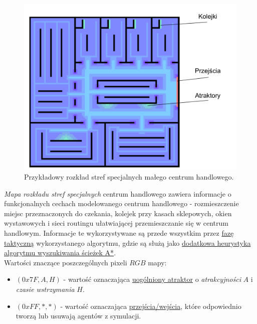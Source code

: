 \documentclass[a4paper, 12pt]{article}
\begin{document}
        \begin{figure}[H]
            \centering
            \includegraphics[scale=0.3]{./img/MallFeatures.pdf}
            \caption{Przykładowy rozkład stref specjalnych małego centrum handlowego.}
            \label{fig:mall-features}
        \end{figure}

        \emph{Mapa rozkładu stref specjalnych} centrum handlowego zawiera informacje o funkcjonalnych cechach modelowanego centrum handlowego - rozmieszczenie miejsc przeznaczonych do czekania, kolejek przy kasach sklepowych, okien wystawowych i sieci routingu ułatwiającej przemieszczanie się w centrum handlowym. Informacje te wykorzystywane są przede wszystkim przez \hyperref[sec:tactical]{fazę taktyczną} wykorzystanego algorytmu, gdzie są służą jako \hyperref[sec:path-deviation]{dodatkowa heurystyka} \hyperref[sec:path-finding]{algorytmu wyszukiwania ścieżek A*}. \\

\noindent
Wartości znaczące poszczególnych pixeli $RGB$ mapy:

        \begin{itemize}
            \item $(0x7F, A, H)$ - wartość oznaczająca \hyperref[sec:path-deviation]{uogólniony atraktor} o \emph{atrakcyjności} $A$ i \emph{czasie wstrzymania} $H$.
            \item $(0xFF, *, *)$ - wartość oznaczająca \hyperref[sec:entrance-exits]{przejścia/wejścia}, które odpowiednio tworzą lub usuwają agentów z symulacji.
        \end{itemize}
\end{document}
